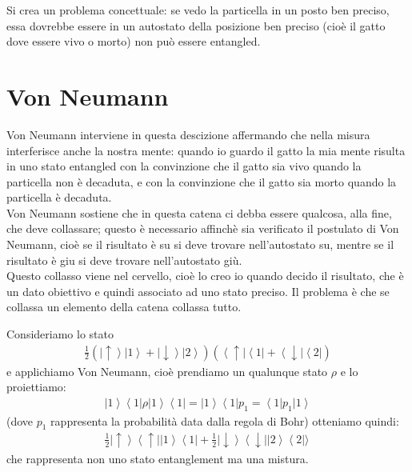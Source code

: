Si crea un problema concettuale: se vedo la particella in un posto ben preciso, essa dovrebbe essere in un autostato della posizione ben preciso (cioè il gatto dove essere vivo o morto) non può essere entangled.

\section{Von Neumann} %
Von Neumann interviene in questa descizione affermando che nella misura interferisce anche la nostra mente: quando io guardo il gatto la mia mente risulta in uno stato entangled con la convinzione che il gatto sia vivo quando la particella non è decaduta, e con la convinzione che il gatto sia morto quando la particella è decaduta.\\
Von Neumann sostiene che in questa catena ci debba essere qualcosa, alla fine, che deve collassare; questo è necessario affinchè sia verificato il postulato di Von Neumann, cioè se il risultato è su si deve trovare nell'autostato su, mentre se il risultato è giu si deve trovare nell'autostato giù.\\
Questo collasso viene nel cervello, cioè lo creo io quando decido il risultato, che è un dato obiettivo e quindi associato ad uno stato preciso.
Il problema è che se collassa un elemento della catena collassa tutto.

Consideriamo lo stato
\begin{equation}\begin{split}
\frac{1}{2}(\left|\uparrow\right\rangle \left|1\right\rangle + \left|\downarrow\right\rangle \left|2\right\rangle)(\left\langle \uparrow\right| \left\langle 1\right| + \left\langle \downarrow\right|\left\langle 2\right|)
\end{split}\end{equation} 
e applichiamo Von Neumann, cioè prendiamo un qualunque stato $\rho$ e lo proiettiamo:
\begin{equation}\begin{split}
\left|1\right\rangle \left\langle 1\right| \rho \left|1\right\rangle \left\langle 1\right|=\left|1\right\rangle \left\langle 1\right| p_{1}=\left\langle 1\right| p_{1} \left|1\right\rangle
\end{split}\end{equation}
(dove $p_{1}$ rappresenta la probabilità data dalla regola di Bohr) otteniamo quindi:
\begin{equation}\begin{split}
\frac{1}{2} \left|\uparrow\right\rangle \left\langle\uparrow\right| \left|1\right\rangle \left\langle 1\right| + \frac{1}{2}\left|\downarrow\right\rangle \left\langle\downarrow\right| \left|2\right\rangle \left\langle 2\right|\rangle\
\end{split}\end{equation}
che rappresenta non uno stato entanglement ma una mistura.

